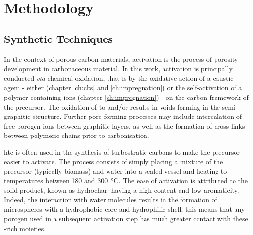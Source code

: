 \chapter{Methodology}
\label{ch:methodology}

\newpage
\section{Synthetic Techniques}\label{s:synthetic}

In the context of porous carbon materials, activation is the process of porosity development in carbonaceous material.\citep{Sevilla2014Energy} In this work, activation is principally conducted \textit{via} chemical oxidation,\citep{Sevilla2014Energy} that is by the oxidative action of a caustic agent - either  (chapter \ref{ch:cbs} and \ref{ch:impregnation}) or the self-activation of a polymer containing  ions (chapter \ref{ch:impregnation}) - on the carbon framework of the precursor. The oxidation of  to  and/or  results in voids forming in the semi-graphitic structure.\citep{Wang2009High, Wang2012, Otowa1993Production} Further pore-forming processes may include intercalation of free \gls{porogen} ions between graphitic layers,\citep{LozanoCastello2007Carbon} as well as the formation of cross-links between polymeric chains prior to carbonisation.\citep{lin2015preparation, yu2017koh, yu2017one}

\Gls{htc} is often used in the synthesis of \glspl{turbostratic carbon} to make the precursor easier to activate. The process consists of simply placing a mixture of the precursor (typically biomass) and water into a sealed vessel and heating to temperatures between 180 and \qty{300}{\degreeCelsius}. The ease of activation is attributed to the solid product, known as \gls{hydrochar}, having a high  content and low aromaticity.\citep{Sevilla2011Hydrothermal, Sevilla2009Chemical, Sevilla2009a} Indeed, the interaction with water molecules results in the formation of microspheres with a hydrophobic core and hydrophilic shell; this means that any \gls{porogen} used in a subsequent activation step has much greater contact with these -rich moieties.

